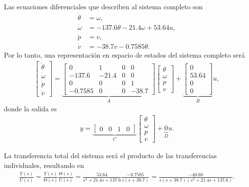 Las ecuaciones diferenciales que describen al sistema completo son
\begin{align*}
    \dot{\theta} &= \omega, \\
    \dot{\omega} &= -137.6 \theta - 21.4 \omega + 53.64 u, \\
    \dot{p} &= v, \\
    \dot{v} &= -38.7 v - 0.7585 \theta.
\end{align*}
Por lo tanto, una representación en espacio de estados del sistema completo será
\begin{align*}
    \begin{bmatrix} \dot{\theta} \\ \dot{\omega} \\ \dot{p} \\ \dot{v} \end{bmatrix} =
        \underbrace{\begin{bmatrix}
            0 & 1 & 0 & 0 \\
            -137.6 & -21.4 & 0 & 0\\
            0 & 0 & 0 & 1 \\
            -0.7585 & 0 & 0 & -38.7
        \end{bmatrix}}_{A} \begin{bmatrix} \theta \\ \omega \\ p \\ v \end{bmatrix}
            + \underbrace{\begin{bmatrix} 0 \\ 53.64 \\ 0 \\ 0 \end{bmatrix}}_{B} u,
\end{align*}
donde la salida es
\begin{align*}
    y = \underbrace{\begin{bmatrix} 0 & 0 & 1 & 0 \end{bmatrix}}_{C} \begin{bmatrix} \theta \\ \omega \\p \\ v \end{bmatrix} + \underbrace{0}_{D} u.
\end{align*}

La transferencia total del sistema será el producto de las transferencias individuales, resultando en
\begin{align*}
    \frac{Y(s)}{U(s)} = \frac{Y(s)}{\Theta(s)} \frac{\Theta(s)}{U(s)}
        = \frac{53.64}{s^2 + 21.4 s + 137.6} \frac{-0.7585}{s(s+38.7)}
        = \frac{-40.68}{s (s+38.7) (s^2 + 21.4 s + 137.6)}.
\end{align*}

